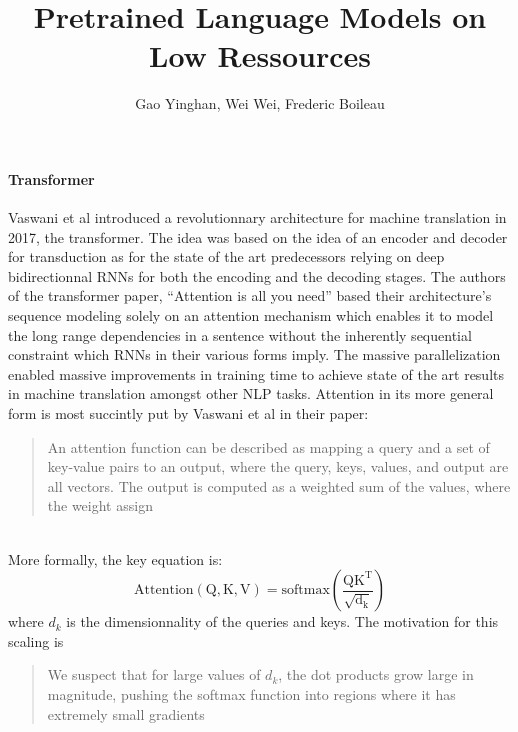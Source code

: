 \documentclass{article}
\title{\textbf{Pretrained Language Models on Low Ressources}}
\author{Gao Yinghan, Wei Wei, Frederic Boileau}
\begin{document}
\thispagestyle{plain}
\maketitle
\medskip


\paragraph{Transformer} Vaswani et al \cite{allyouneed} introduced a
revolutionnary architecture for machine translation in 2017, the transformer.
The idea was based on the idea of an encoder and decoder for transduction as for
the state of the art predecessors relying on deep bidirectionnal RNNs for both
the encoding and the decoding stages. The authors of the transformer paper,
``Attention is all you need'' based their architecture's sequence modeling
solely on an attention mechanism which enables it to model the long range
dependencies in a sentence without the inherently sequential constraint which
RNNs in their various forms imply. The massive parallelization enabled massive
improvements in training time to achieve state of the art results in machine
translation amongst other NLP tasks.  Attention in its more general form is most
succintly put by Vaswani et al in their paper: \blockcquote{allyouneed}{An
attention function can be described as mapping a query and a set of key-value
pairs to an output, where the query, keys, values, and output are all vectors.
The output is computed as a weighted sum of the values, where the weight
assign}\\

More formally, the key equation is:
\begin{equation}
  \label{eq:1}
  \mathrm{Attention(Q,K,V) =
    \mathrm{softmax}\left(\frac{QK^{T}}{\sqrt{d_{k}}}\right)}
\end{equation}
where $d_{k}$ is the dimensionnality of the queries and keys. The motivation
for this scaling is \blockcquote{allyouneed}{We suspect that for large values of
$d_{k}$, the dot products grow large in magnitude, pushing the softmax function
into regions where it has extremely small gradients}
\end{document}
